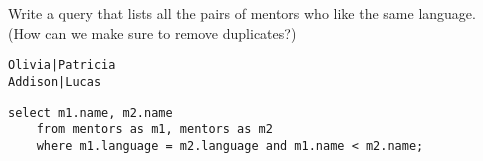 \begin{blocksection}
\question Write a query that lists all the pairs of mentors who like the same language. (How can we make sure to remove duplicates?)

\begin{lstlisting}
Olivia|Patricia
Addison|Lucas
\end{lstlisting}

\begin{solution}[1in]
\begin{lstlisting}
select m1.name, m2.name
    from mentors as m1, mentors as m2
    where m1.language = m2.language and m1.name < m2.name;
\end{lstlisting}
\end{solution}
\end{blocksection}
